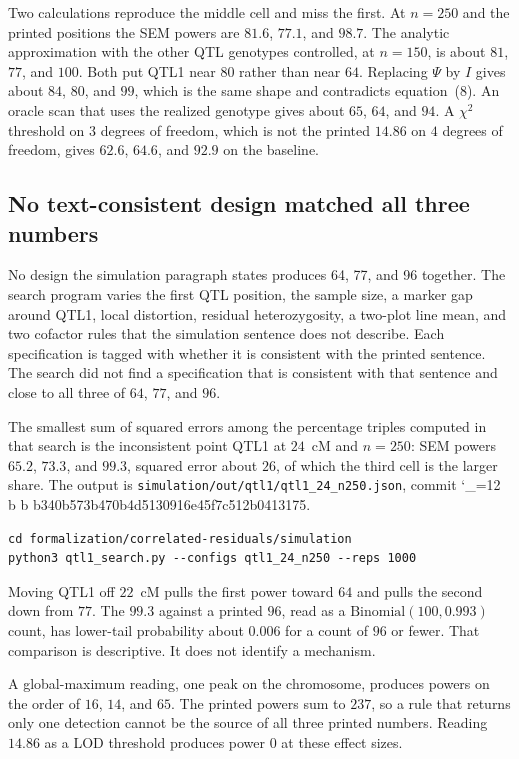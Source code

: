 \documentclass[11pt]{article}
\makeatletter
\newcommand{\sha}{\begingroup\catcode`\_=12 \sha@read}
\newcommand{\sha@read}[1]{\ttfamily\sha@loop#1\relax\endgroup}
\def\sha@loop#1{%
  \ifx\relax#1\else
    #1\allowbreak
    \expandafter\sha@loop
  \fi}
\makeatother
\begin{document}
Two calculations reproduce the middle cell and miss the first. At $n=250$
and the printed positions the SEM powers are $81.6$, $77.1$, and $98.7$.
The analytic approximation with the other QTL genotypes controlled, at
$n=150$, is about $81$, $77$, and $100$. Both put QTL1 near $80$ rather than
near $64$. Replacing $\Psi$ by $I$ gives about $84$, $80$, and $99$, which
is the same shape and contradicts equation~(8). An oracle scan that uses the
realized genotype gives about $65$, $64$, and $94$. A $\chi^2$ threshold on
$3$ degrees of freedom, which is not the printed $14.86$ on $4$ degrees of
freedom, gives $62.6$, $64.6$, and $92.9$ on the baseline.

\subsection{No text-consistent design matched all three numbers}

No design the simulation paragraph states produces 64, 77, and 96 together.
The search program varies the first QTL position, the sample size, a
marker gap around QTL1, local distortion, residual heterozygosity, a
two-plot line mean, and two cofactor rules that the simulation sentence does
not describe. Each specification is tagged with whether it is consistent
with the printed sentence. The search did not find a specification that is
consistent with that sentence and close to all three of $64$, $77$, and
$96$.

The smallest sum of squared errors among the percentage triples computed in
that search is the inconsistent point QTL1 at $24$~cM and $n=250$: SEM
powers $65.2$, $73.3$, and $99.3$, squared error about $26$, of which the
third cell is the larger share. The output is
\texttt{simulation/out/qtl1/qtl1\_24\_n250.json}, commit
\sha{bb340b573b470b4d5130916e45f7c512b0413175}.
\begin{verbatim}
cd formalization/correlated-residuals/simulation
python3 qtl1_search.py --configs qtl1_24_n250 --reps 1000
\end{verbatim}
Moving QTL1 off $22$~cM pulls the first power toward $64$ and pulls the
second down from $77$. The $99.3$ against a printed $96$, read as a
$\mathrm{Binomial}(100, 0.993)$ count, has lower-tail probability about
$0.006$ for a count of $96$ or fewer. That comparison is descriptive. It
does not identify a mechanism.

A global-maximum reading, one peak on the chromosome, produces powers on the
order of $16$, $14$, and $65$. The printed powers sum to $237$, so a rule
that returns only one detection cannot be the source of all three printed
numbers. Reading $14.86$ as a LOD threshold produces power $0$ at these
effect sizes.
\end{document}

